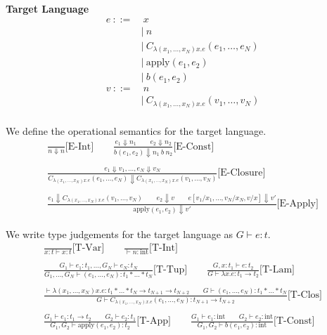 \documentclass[9pt]{article}
\renewcommand*{\int}{\text{int}}
\newcommand*{\apply}{\text{apply}}
\begin{document}
\textbf{Target Language}
\begin{align*}
    e\ ::=&\ x\\
    &|\ n\\
    &|\ C_{\lambda (x_1, \dots, x_N) x.e} (e_1, \dots, e_N)\\
    &|\ \apply (e_1, e_2)\\
    &|\ b (e_1, e_2)\\
    v\ ::=&\ n\\
    &|\ C_{\lambda (x_1, \dots, x_N) x.e} (v_1, \dots, v_N)\\
\end{align*}

We define the operational semantics for the target language.
\begin{gather*}
    \frac{}{n \Downarrow n} \text{[E-Int]} \qquad
    \frac{e_1 \Downarrow n_1 \qquad e_2 \Downarrow n_2}{b(e_1, e_2) \Downarrow n_1\ b\ n_2} \text{[E-Const]}\\ \\
    \frac{e_1 \Downarrow v_1, \dots, e_N \Downarrow v_N}{C_{\lambda (x_1, \dots, x_N) x.e} (e_1, \dots, e_N) \Downarrow C_{\lambda (x_1, \dots, x_N) x.e} (v_1, \dots, v_N)} \text{[E-Closure]}\\ \\
    \frac{e_1 \Downarrow C_{\lambda (x_1, \dots, x_N) x.e} (v_1, \dots, v_N) \qquad e_2 \Downarrow v \qquad e[v_1/x_1, \dots, v_N/x_N, v/x] \Downarrow v'}{\apply (e_1, e_2) \Downarrow v'}\text{[E-Apply]}
\end{gather*}

We write type judgements for the target language as $G \vdash e : t$.
\begin{gather*}
    \frac{}{x: t \vdash x: t} \text{[T-Var]} \qquad
    \frac{}{\vdash n : \int} \text{[T-Int]}\\ \\
    \frac{G_1 \vdash e_1 : t_1, \dots, G_N \vdash e_N: t_N}{G_1, \dots, G_N \vdash (e_1, \dots, e_N): t_1 * \dots * t_N}\text{[T-Tup]} \qquad
    \frac{G, x:t_1 \vdash e : t_2}{G \vdash \lambda x.e : t_1 \rightarrow t_2}\text{[T-Lam]}\\ \\
    \frac{\vdash \lambda (x_1,\dots,x_N) x.e: t_1 * \dots * t_N \rightarrow t_{N+1} \rightarrow t_{N+2} \qquad G \vdash (e_1, \dots, e_N) : t_1 * \dots * t_N}{G \vdash C_{\lambda (x_1, \dots, x_N) x.e} (e_1, \dots, e_N): t_{N+1} \rightarrow t_{N+2}} \text{[T-Clos]}\\ \\
    \frac{G_1 \vdash e_1 : t_1 \rightarrow t_2 \qquad G_2 \vdash e_2: t_1}{G_1, G_2 \vdash \apply(e_1, e_2) : t_2} \text{[T-App]}\qquad
    \frac{G_1 \vdash e_1 : \int \qquad G_2 \vdash e_2 : \int}{G_1, G_2 \vdash b(e_1, e_2) : \int} \text{[T-Const]}
\end{gather*}
\end{document}
